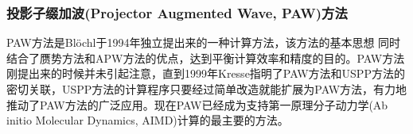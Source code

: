 {%
%
%
%
\subsubsection{投影子缀加波(Projector Augmented Wave, PAW)方法}
PAW方法是\textrm{Bl\"ochl}于1994年独立提出来的一种计算方法\cite{PRB50-17953_1994}，该方法的基本思想%
同时结合了赝势方法和APW方法的优点，达到平衡计算效率和精度的目的。PAW方法刚提出来的时候并未引起注意，直到1999年\textrm{Kresse}指明了PAW方法和USPP方法的密切关联，USPP方法的计算程序只要经过简单改造就能扩展为PAW方法，有力地推动了PAW方法的广泛应用\cite{PRB59-1758_1999}。现在PAW已经成为支持第一原理分子动力学(Ab initio Molecular Dynamics, AIMD)计算的最主要的方法。

}
